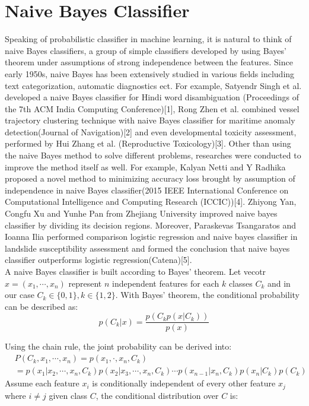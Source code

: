 \documentclass{kththesis}
\begin{document}
\section{Naive Bayes Classifier}
Speaking of probabilistic classifier in machine learning, it is natural to think of naive Bayes classifiers, a group of simple classifiers developed by using Bayes' theorem under assumptions of strong independence between the features. Since early 1950s, naive Bayes has been extensively studied in various fields including text categorization, automatic diagnostics ect. For example, Satyendr Singh et al. developed a naive Bayes classifier for Hindi word disambiguation (Proceedings of the 7th ACM India Computing Conference)[1], Rong Zhen et al. combined vessel trajectory clustering technique with naive Bayes classifier for maritime anomaly detection(Journal of Navigation)[2] and even developmental toxicity assessment, performed by Hui Zhang et al. (Reproductive Toxicology)[3]. Other than using the naive Bayes method to solve different problems, researches were conducted to improve the method itself as well. For example, Kalyan Netti and Y Radhika proposed a novel method to minimizing accuracy loss brought by assumption of independence in naive Bayes classifier(2015 IEEE International Conference on Computational Intelligence and Computing Research (ICCIC))[4]. Zhiyong Yan, Congfu Xu and Yunhe Pan from Zhejiang University improved naive bayes classifier by dividing its decision regions. Moreover, Paraskevas Tsangaratos and Ioanna Ilia performed comparison logistic regression and naive bayes classifier in landslide susceptibility assessment and formed the conclusion that naive bayes classifier outperforms logistic regression(Catena)[5].\\

A naive Bayes classifier is built according to Bayes' theorem. Let vecotr $x=(x_{1},\cdots,x_{n})$ represent $n$ independent features for each $k$ classes $C_{k}$ and in our case $C_{k}\in \{0,1\}, k\in \{1,2\}$. With Bayes' theorem, the conditional probability can be described as:
\begin{equation}
p(C_{k}|x)=\frac{p(C_{k}p(x|C_{k}))}{p(x)}
\end{equation}

Using the chain rule, the joint probability can be derived into:
\begin{align}
&P(C_{k},x_{1},\cdots,x_{n})=p(x_{1},\cdot,x_{n},C_{k})\\
&=p(x_{1}|x_{2},\cdots,x_{n},C_{k})p(x_{2}|x_{3},\cdots,x_{n},C_{k})\cdots p(x_{n-1}|x_{n},C_{k})p(x_{n}|C_{k})p(C_{k})
\end{align}
Assume each feature $x_{i}$ is conditionally independent of every other feature $x_{j}$ where $i\neq j$ given class $C$, the conditional distribution over $C$ is:
\end{document}
